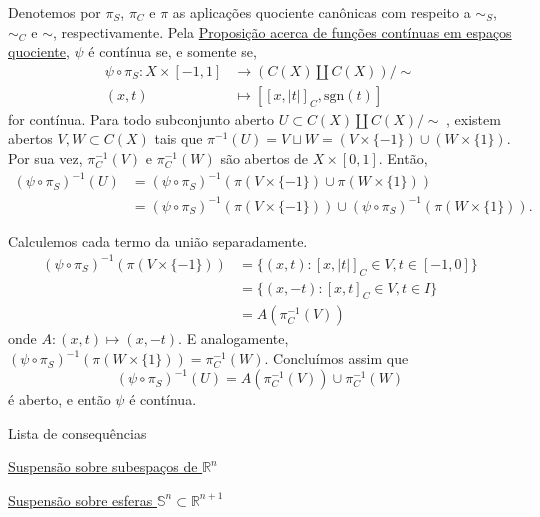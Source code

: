 \begin{prop}
\begin{dem}
        Denotemos por $\pi_S$, $\pi_C$ e $\pi$ as aplicações quociente canônicas com respeito a $\sim_S$, $\sim_C$ e $\sim$, respectivamente. Pela \hyperref[funcao-continua-em-topologia-quociente-prop]{Proposição acerca de funções contínuas em espaços quociente}, $\psi$ é contínua se, e somente se,\begin{align*}
            \psi \circ \pi_S: X\times[-1,1] &\rightarrow (C(X) \amalg C(X))/ \sim\\
            (x,t) &\mapsto [[x,|t|]_C,\text{sgn}(t)]
        \end{align*}
        for contínua. Para todo subconjunto aberto $U \subset C(X)\amalg C(X)/\sim\hspace{3pt}$, existem abertos $V,W \subset C(X)$ tais que $\pi^{-1}(U) = V\sqcup W = (V\times\{-1\}) \cup (W\times\{1\})$. Por sua vez, $\pi_C^{-1}(V)$ e $\pi_C^{-1}(W)$ são abertos de $X\times[0,1]$. Então,
        \begin{align*}
        (\psi \circ \pi_S)^{-1}(U)
        &= (\psi \circ \pi_S)^{-1}(\pi(V\times\{-1\}) \cup \pi(W\times\{1\}))\\
        &= (\psi \circ \pi_S)^{-1}(\pi(V\times\{-1\})) \cup (\psi \circ \pi_S)^{-1}(\pi(W\times\{1\})).   
        \end{align*}
        
        Calculemos cada termo da união separadamente.
        \begin{align*}
            (\psi \circ \pi_S)^{-1}(\pi(V\times\{-1\}))
            &= \{(x,t): [x,|t|]_C \in V, t \in [-1,0]\}\\
            &= \{(x,-t): [x,t]_C \in V, t \in I\}\\
            &= A(\pi_C^{-1}(V))   
        \end{align*}
        onde $A: (x,t) \mapsto (x,-t)$. E analogamente, $(\psi \circ \pi_S)^{-1}(\pi(W\times\{1\})) = \pi_C^{-1}(W)$. Concluímos assim que
        \[(\psi \circ \pi_S)^{-1}(U) = A(\pi_C^{-1}(V)) \cup \pi_C^{-1}(W)\]
        é aberto, e então $\psi$ é contínua.
    \end{dem}
\end{prop}


\begin{titlemize}{Lista de consequências}
    \item \hyperref[suspensao-euclidiano-prop]{Suspensão sobre subespaços de $\mathbb{R}^n$}
    \item \hyperref[suspensao-esfera-prop]{Suspensão sobre esferas $\mathbb{S}^n\subset\mathbb{R}^{n+1}$}
\end{titlemize}


